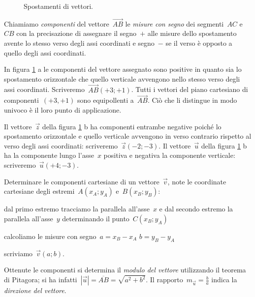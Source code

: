 \begin{inaccessibleblock}
 \begin{figure}[b]
\centering

\caption{Spostamenti di vettori.}\label{fig:F.4}
\end{figure}
\end{inaccessibleblock}


\begin{definizione}
Chiamiamo \emph{componenti} del vettore~$\overrightarrow{AB}$ le \emph{misure 
con segno} dei segmenti~$AC$ e~$CB$ con la precisazione di assegnare il 
segno~$+$ alle misure
dello spostamento avente lo stesso verso degli assi coordinati e segno~$-$ se 
il verso è opposto a quello degli assi coordinati.
\end{definizione}

In figura \ref{fig:F.4} a le componenti del vettore assegnato sono positive in 
quanto sia lo spostamento orizzontale che quello verticale avvengono nello 
stesso
verso degli assi coordinati. Scriveremo~$\overrightarrow{AB}(+3;+1)$. Tutti i 
vettori del piano cartesiano di componenti~$(+3,+1)$ sono equipollenti 
a~$\overrightarrow{AB}$.
Ciò che li distingue in modo univoco è il loro punto di applicazione.

\begin{exrig}
\begin{esempio}
Il vettore~$\vec{z}$ della figura \ref{fig:F.4} b ha componenti entrambe 
negative poiché lo spostamento orizzontale e quello verticale avvengono in verso
contrario rispetto al verso degli assi coordinati: scriveremo~$\vec{z}(-2;-3)$. 
Il vettore~$\vec{u}$ della figura \ref{fig:F.4} b ha la componente
lungo l'asse~$x$ positiva e negativa la componente verticale: 
scriveremo~$\vec{u}(+4;-3)$.
\end{esempio}
\end{exrig}

\begin{procedura}
Determinare le componenti cartesiane di un vettore~$\vec{v}$, note le 
coordinate cartesiane degli estremi~$A(x_A;y_A)$ e~$B(x_B;y_B)$:
\begin{enumeratea}
\item dal primo estremo tracciamo la parallela all'asse~$x$ e dal secondo 
estremo la parallela all'asse~$y$ determinando il punto~$C(x_B;y_A)$
\item calcoliamo le misure con segno~$a=x_B-x_A$ $b=y_B-y_A$
\item scriviamo~$\vec{v}(a;b)$.
\end{enumeratea}
\end{procedura}
Ottenute le componenti si determina il \emph{modulo del vettore} utilizzando il 
teorema di Pitagora; si ha infatti~$|\vec{u}|=\overline{AB}=\sqrt{a^2+b^2}$.
Il rapporto~$m_{\vec{u}}=\frac{b}{a}$ indica la \emph{direzione del vettore}.


